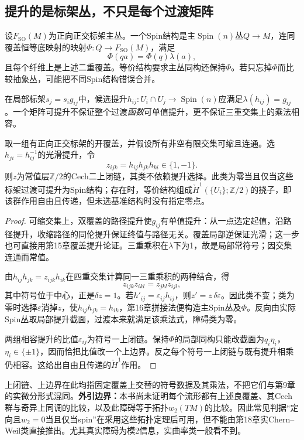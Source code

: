 \subsection{提升的是标架丛，不只是每个过渡矩阵}
设$F_{\mathrm{SO}}(M)$为正向正交标架主丛。一个Spin结构是主$\operatorname{Spin}(n)$丛$Q\to M$，连同覆盖恒等底映射的映射$\Phi:Q\to F_{\mathrm{SO}}(M)$，满足
\[
 \Phi(qa)=\Phi(q)\lambda(a),
\]
且每个纤维上是上述二重覆盖。等价结构要求主丛同构还保持$\Phi$。若只忘掉$\Phi$而比较抽象丛，可能把不同Spin结构错误合并。

在局部标架$s_j=s_i g_{ij}$中，候选提升$h_{ij}:U_i\cap U_j\to\operatorname{Spin}(n)$应满足$\lambda(h_{ij})=g_{ij}$。一个矩阵可提升不保证整个过渡\emph{函数}可单值提升，更不保证三重交集上的乘法相容。

\begin{proposition}[给定覆盖上的符号障碍]\label{prop:spin-cocycle}
取一组有正向正交标架的开覆盖，并假设所有非空有限交集可缩且连通。选$h_{ji}=h_{ij}^{-1}$的光滑提升，令
\[
 z_{ijk}=h_{ij}h_{jk}h_{ki}\in\{1,-1\}.
\]
则$z$为常值层$\mathbb Z/2$的Cech二上闭链，其类不依赖提升选择。此类为零当且仅当这些标架过渡可提升为Spin结构；存在时，等价结构组成$\check H^1(\{U_i\};\mathbb Z/2)$的挠子，即该群作用自由且传递，但未选基准结构时没有指定零点。
\end{proposition}
\begin{proof}
可缩交集上，双覆盖的路径提升使$g_{ij}$有单值提升：从一点选定起值，沿路径提升，收缩路径的同伦提升保证终值与路径无关。覆盖局部逆保证光滑；这一步也可直接用第15章覆盖提升论证。三重乘积在$\lambda$下为1，故是局部常符号；因交集连通而常值。

由$h_{ij}h_{jk}=z_{ijk}h_{ik}$在四重交集计算同一三重乘积的两种结合，得
\[
 z_{ijk}z_{ikl}=z_{jkl}z_{ijl},
\]
其中符号位于中心，正是$\delta z=1$。若$h'_{ij}=\varepsilon_{ij}h_{ij}$，则$z'=z\,\delta\varepsilon$。因此类不变；类为零时选择$\varepsilon$消掉$z$，使$h_{ij}h_{jk}=h_{ik}$，第16章拼接法便构造主Spin丛及$\Phi$。反向由实际Spin丛取局部提升截面，过渡本来就满足该乘法式，障碍类为零。

两组相容提升的比值$\varepsilon_{ij}$为符号一上闭链。保持$\Phi$的局部同构只能改截面为$q_i\eta_i$，$\eta_i\in\{\pm1\}$，因而恰把比值改一个上边界。反之每个符号一上闭链与既有提升相乘仍相容。这给出自由且传递的$\check H^1$作用。
\end{proof}
上闭链、上边界在此均指固定覆盖上交替的符号数据及其乘法，不把它们与第9章的实微分形式混同。\textbf{外引边界：}本书尚未证明每个流形都有上述良覆盖、其Cech群与奇异上同调的比较，以及此障碍等于拓扑$w_2(TM)$的比较。因此常见判据“定向且$w_2=0$当且仅当spin”在采用这些拓扑定理后可用，但不能由第18章实Chern--Weil类直接推出。尤其真实障碍为模2信息，实曲率类一般看不到。

